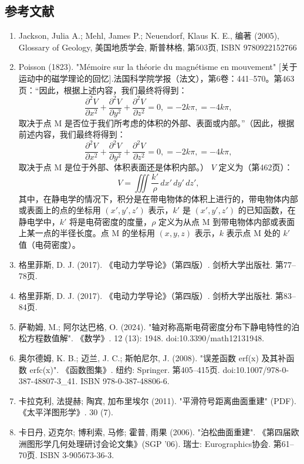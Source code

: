 \subsection{参考文献}  
\begin{enumerate}
\item Jackson, Julia A.; Mehl, James P.; Neuendorf, Klaus K. E., 编著 (2005), Glossary of Geology, 美国地质学会, 斯普林格, 第503页, ISBN 9780922152766  
\item Poisson (1823). "Mémoire sur la théorie du magnétisme en mouvement" [关于运动中的磁学理论的回忆].法国科学院学报（法文），第6卷：441–570。第463页：“因此，根据上述内容，我们最终将得到：  
\[
\frac{\partial^2 V}{\partial x^2} + \frac{\partial^2 V}{\partial y^2} + \frac{\partial^2 V}{\partial z^2} = 0, = -2k\pi, = -4k\pi,~
\]
取决于点 M 是否位于我们所考虑的体积的外部、表面或内部。”（因此，根据前述内容，我们最终将得到：  
\[
\frac{\partial^2 V}{\partial x^2} + \frac{\partial^2 V}{\partial y^2} + \frac{\partial^2 V}{\partial z^2} = 0, = -2k\pi, = -4k\pi,~
\]
取决于点 M 是位于外部、体积表面还是体积内部。）  
\(V\) 定义为（第462页）：  
\[
V = \iiint \frac{k'}{\rho} \, dx' \, dy' \, dz',~
\]
其中，在静电学的情况下，积分是在带电物体的体积上进行的，带电物体内部或表面上的点的坐标用 \((x', y', z')\) 表示，\(k'\) 是 \( (x', y', z') \) 的已知函数，在静电学中，\(k'\) 将是电荷密度的度量，\(\rho\) 定义为从点 M 到带电物体内部或表面上某一点的半径长度。点 M 的坐标用 \((x, y, z)\) 表示，\(k\) 表示点 M 处的 \(k'\) 值（电荷密度）。
\item 格里菲斯, D. J. (2017). 《电动力学导论》（第四版）. 剑桥大学出版社. 第77–78页.  
\item 格里菲斯, D. J. (2017). 《电动力学导论》（第四版）. 剑桥大学出版社. 第83–84页.  
\item 萨勒姆, M.; 阿尔达巴格, O. (2024). "轴对称高斯电荷密度分布下静电特性的泊松方程数值解". 《数学》. 12 (13): 1948. doi:10.3390/math12131948.  
\item 奥尔德姆, K. B.; 迈兰, J. C.; 斯帕尼尔, J. (2008). "误差函数 erf(x) 及其补函数 erfc(x)". 《函数图集》. 纽约: Springer. 第405–415页. doi:10.1007/978-0-387-48807-3_41. ISBN 978-0-387-48806-6.  
\item 卡拉克利, 法提赫; 陶宾, 加布里埃尔 (2011). "平滑符号距离曲面重建" (PDF). 《太平洋图形学》. 30 (7).  
\item 卡日丹, 迈克尔; 博利索, 马修; 霍普, 雨果 (2006). "泊松曲面重建". 《第四届欧洲图形学几何处理研讨会论文集》(SGP '06). 瑞士: Eurographics协会. 第61–70页. ISBN 3-905673-36-3.
\end{enumerate}
